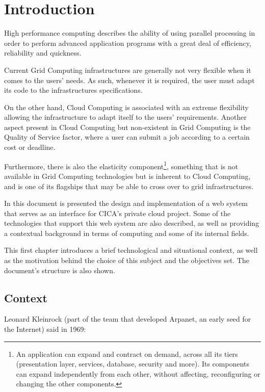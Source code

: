 \chapter{Introduction} \label{chap:intro}

High performance computing describes the ability of using parallel processing in order to perform advanced application programs with a great deal of efficiency, reliability and quickness. \cite{hpclinux}

Current Grid Computing infrastructures are generally not very flexible when it comes to the users' needs. As such, whenever it is required, the user must adapt its code to the infrastructures specifications.

On the other hand, Cloud Computing is associated with an extreme flexibility allowing the infrastructure to adapt itself to the users' requirements. Another aspect present in Cloud Computing but non-existent in Grid Computing is the Quality of Service factor, where a user can submit a job according to a certain cost or deadline.

Furthermore, there is also the elasticity component\footnote{An application can expand and contract on demand, across all its tiers (presentation layer, services, database, security and more). Its components can expand independently from each other, without affecting, reconfiguring or changing the other components.}, something that is not available in Grid Computing technologies but is inherent to Cloud Computing, and is one of its flagships that may be able to cross over to grid infrastructures.

In this document is presented the design and implementation of a web system that serves as an interface for CICA's private cloud project. Some of the technologies that support this web system are also described, as well as providing a contextual background in terms of computing and some of its internal fields.

This first chapter introduces a brief technological and situational context, as well as the motivation behind the choice of this subject and the objectives set. The document's structure is also shown.

\section{Context} \label{sec:context}

Leonard Kleinrock (part of the team that developed Arpanet, an early seed for the Internet) said in 1969:

